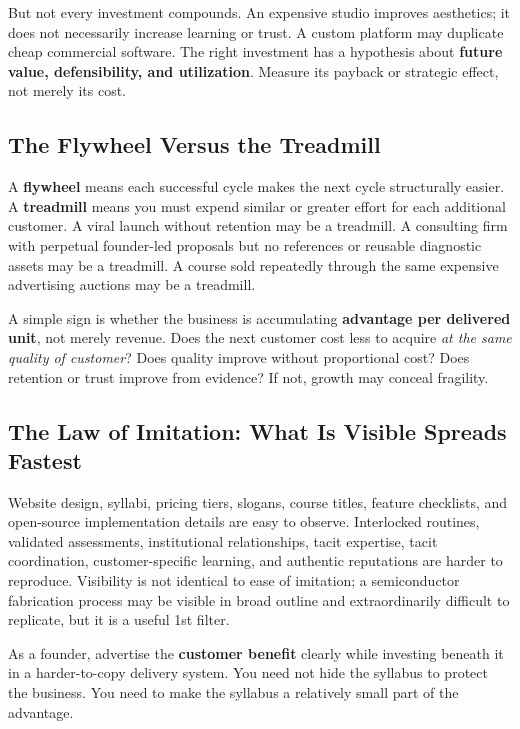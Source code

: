 But not every investment compounds. An expensive studio improves aesthetics; it does not necessarily increase learning or trust. A custom platform may duplicate cheap commercial software. The right investment has a hypothesis about \textbf{future value, defensibility, and utilization}. Measure its payback or strategic effect, not merely its cost.

\subsection{The Flywheel Versus the Treadmill}
\label{sec:flywheel_vs_treadmill}

A \textbf{flywheel} means each successful cycle makes the next cycle structurally easier. A \textbf{treadmill} means you must expend similar or greater effort for each additional customer. A viral launch without retention may be a treadmill. A consulting firm with perpetual founder-led proposals but no references or reusable diagnostic assets may be a treadmill. A course sold repeatedly through the same expensive advertising auctions may be a treadmill.

A simple sign is whether the business is accumulating \textbf{advantage per delivered unit}, not merely revenue. Does the next customer cost less to acquire \textit{at the same quality of customer}? Does quality improve without proportional cost? Does retention or trust improve from evidence? If not, growth may conceal fragility.

\subsection{The Law of Imitation: What Is Visible Spreads Fastest}
\label{sec:law_of_imitation}

Website design, syllabi, pricing tiers, slogans, course titles, feature checklists, and open-source implementation details are easy to observe. Interlocked routines, validated assessments, institutional relationships, tacit expertise, tacit coordination, customer-specific learning, and authentic reputations are harder to reproduce. Visibility is not identical to ease of imitation; a semiconductor fabrication process may be visible in broad outline and extraordinarily difficult to replicate, but it is a useful 1st filter.

As a founder, advertise the \textbf{customer benefit} clearly while investing beneath it in a harder-to-copy delivery system. You need not hide the syllabus to protect the business. You need to make the syllabus a relatively small part of the advantage.

